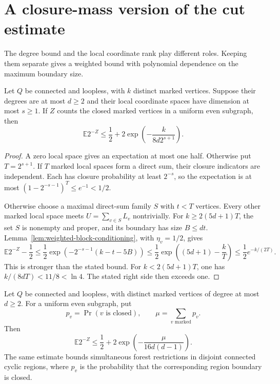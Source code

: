\section{A closure-mass version of the cut estimate}
\label{sec:closure-mass-cuts}

The degree bound and the local coordinate rank play different roles.
Keeping them separate gives a weighted bound with polynomial dependence on the maximum boundary size.

\begin{lemma}\label{lem:degree-rank-cut-estimate}
Let $Q$ be connected and loopless, with $k$ distinct marked vertices.
Suppose their degrees are at most $d\ge2$ and their local coordinate spaces have dimension at most $s\ge1$.
If $Z$ counts the closed marked vertices in a uniform even subgraph, then
\[
 \mathbb E2^{-Z}\le\frac12+2\exp\!\left(-\frac{k}{8d2^{s+1}}\right).
\]
\end{lemma}

\begin{proof}
A zero local space gives an expectation at most one half.
Otherwise put $T=2^{s+1}$.
If $T$ marked local spaces form a direct sum, their closure indicators are independent.
Each has closure probability at least $2^{-s}$, so the expectation is at most
$(1-2^{-s-1})^T\le e^{-1}<1/2$.

Otherwise choose a maximal direct-sum family $S$ with $t<T$ vertices.
Every other marked local space meets $U=\sum_{v\in S}L_v$ nontrivially.
For $k\ge2(5d+1)T$, the set $S$ is nonempty and proper, and its boundary has size $B\le dt$.
Lemma~\ref{lem:weighted-block-conditioning}, with $\eta_v=1/2$, gives
\[
 \mathbb E2^{-Z}-\frac12
 \le\frac12\exp\!\left(-2^{-s-1}(k-t-5B)\right)
 \le\frac12\exp\!\left((5d+1)-\frac{k}{T}\right)
 \le\frac12 e^{-k/(2T)}.
\]
This is stronger than the stated bound.
For $k<2(5d+1)T$, one has $k/(8dT)<11/8<\ln4$.
The stated right side then exceeds one.
\end{proof}

\begin{corollary}\label{cor:closure-mass-cut-estimate}
Let $Q$ be connected and loopless, with distinct marked vertices of degree at most $d\ge2$.
For a uniform even subgraph, put
\[
 p_v=\Pr(v\text{ is closed}),\qquad \mu=\sum_{v\text{ marked}}p_v.
\]
Then
\begin{equation}\label{eq:closure-mass-cut-estimate}
 \mathbb E2^{-Z}
 \le\frac12+2\exp\!\left(-\frac{\mu}{16d(d-1)}\right).
\end{equation}
The same estimate bounds simultaneous forest restrictions in disjoint connected cyclic regions,
where $p_v$ is the probability that the corresponding region boundary is closed.
\end{corollary}

